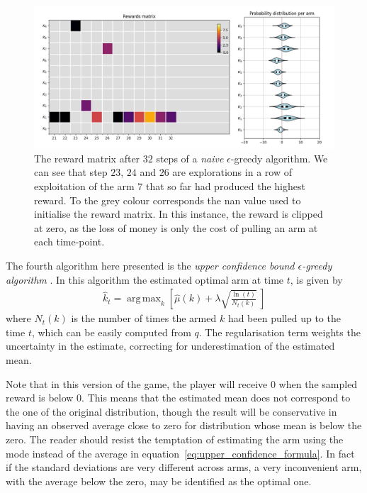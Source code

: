 \documentclass[]{scrartcl}
\DeclareMathOperator*{\argmax}{arg\,max}
\theoremstyle{definition}
\begin{document}
\begin{figure}[h]
    \hspace{-1cm}
    \includegraphics[width=17cm]{figures/step_32.jpg}
    \caption{The reward matrix after $32$ steps of a \emph{naive} $\epsilon$-greedy algorithm. We can see that step $23$, $24$ and $26$ are explorations in a row of exploitation of the arm $7$ that so far had produced the highest reward. To the grey colour corresponds the nan value used to initialise the reward matrix. In this instance, the reward is clipped at zero, as the loss of money is only the cost of pulling an arm at each time-point.}
    \label{fig:step_32}
\end{figure}

The fourth algorithm here presented is the \emph{upper confidence bound $\epsilon$-greedy algorithm} \cite{sutton2018reinforcement}. In this algorithm the estimated optimal arm at time $t$, is given by
\begin{align}\label{eq:upper_confidence_formula}
\hat{k}_t = \argmax_{k} \left[ \hat{\mu}(k) + \lambda \sqrt{ \frac{\ln(t)}{ N_{t}(k) }  } ~\right]
\end{align}
where $N_{t}(k)$ is the number of times the armed $k$ had been pulled up to the time $t$, which can be easily computed from $q$. The regularisation term weights the uncertainty in the estimate, correcting for underestimation of the estimated mean.

Note that in this version of the game, the player will receive $0$ when the sampled reward is below $0$. This means that the estimated mean does not correspond to the one of the original distribution, though the result will be conservative in having an observed average close to zero for distribution whose mean is below the zero. The reader should resist the temptation of estimating the arm using the mode instead of the average in equation~\ref{eq:upper_confidence_formula}. In fact if the standard deviations are very different across arms, a very inconvenient arm, with the average below the zero, may be identified as the optimal one.
\end{document}
